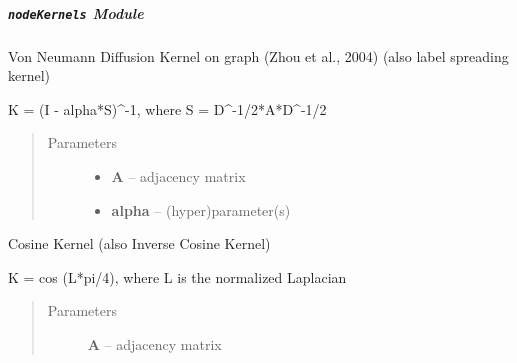\documentclass[letterpaper,10pt,english]{sphinxmanual}
\begin{document}
\subparagraph{\texttt{nodeKernels} Module}
\label{pyGPs.GraphExtension:nodekernels-module}\label{pyGPs.GraphExtension:module-pyGPs.GraphExtension.nodeKernels}

\begin{fulllineitems}
\label{pyGPs.GraphExtension:pyGPs.GraphExtension.nodeKernels.VNDKernel}
Von Neumann Diffusion Kernel on graph (Zhou et al., 2004)
(also label spreading kernel)

K = (I - alpha*S)\textasciicircum{}-1, where S = D\textasciicircum{}-1/2*A*D\textasciicircum{}-1/2
\begin{quote}\begin{description}
\item[{Parameters}] \leavevmode\begin{itemize}
\item {} 
\textbf{A} -- adjacency matrix

\item {} 
\textbf{alpha} -- (hyper)parameter(s)

\end{itemize}

\end{description}\end{quote}

\end{fulllineitems}


\begin{fulllineitems}
\label{pyGPs.GraphExtension:pyGPs.GraphExtension.nodeKernels.cosKernel}
Cosine Kernel (also Inverse Cosine Kernel)

K = cos (L*pi/4), where L is the normalized Laplacian
\begin{quote}\begin{description}
\item[{Parameters}] \leavevmode
\textbf{A} -- adjacency matrix

\end{description}\end{quote}

\end{fulllineitems}
\end{document}
